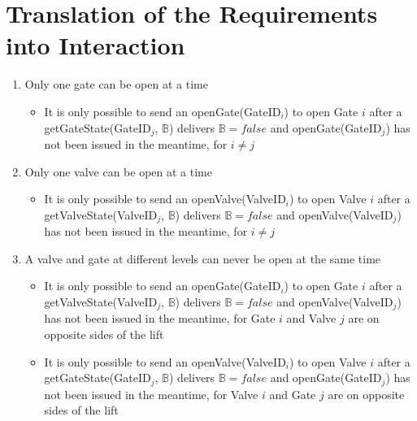 \section{Translation of the Requirements into Interaction}
\begin{enumerate}
	\item Only one gate can be open at a time
		\begin{itemize}
			\item It is only possible to send an openGate(GateID$_i$) to open Gate $i$ after a getGateState(GateID$_j$, $ \mathbb{B} $) delivers $\mathbb{B} = false$ and openGate(GateID$_j$) has not been issued in the meantime, for $i \neq j$
		\end{itemize}
	
	\item Only one valve can be open at a time
	
		\begin{itemize}
			\item It is only possible to send an openValve(ValveID$_i$) to open Valve $i$ after a getValveState(ValveID$_j$, $ \mathbb{B} $) delivers $\mathbb{B} = false$ and openValve(ValveID$_j$) has not been issued in the meantime, for $i \neq j$
		\end{itemize}
	
	\item A valve and gate at different levels can never be open at the same time
		\begin{itemize}
			\item It is only possible to send an openGate(GateID$_i$) to open Gate $i$ after a getValveState(ValveID$_j$, $ \mathbb{B} $) delivers $\mathbb{B} = false$ and openValve(ValveID$_j$) has not been issued in the meantime, for Gate $i$ and Valve $j$ are on opposite sides of the lift 
			\item It is only possible to send an openValve(ValveID$_i$) to open Valve $i$ after a getGateState(GateID$_j$, $ \mathbb{B} $) delivers $\mathbb{B} = false$ and openGate(GateID$_j$) has not been issued in the meantime, for Valve $i$ and Gate $j$ are on opposite sides of the lift
		\end{itemize}
	
	

\end{enumerate}
